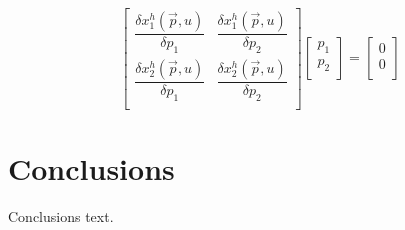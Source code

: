 \documentclass[utf8, twoside,]{article}
\begin{document}
\begin{otherlanguage}{american}
      \begin{equation*}
    \begin{bmatrix}
 \dfrac{\delta x_1^h(\vec{p}, u)}{\delta p_1} 
 & \dfrac{\delta x_1^h(\vec{p}, u)}{\delta p_2} \\[2ex]
 \dfrac{\delta x_2^h(\vec{p}, u)}{\delta p_1} 
 & \dfrac{\delta x_2^h(\vec{p}, u)}{\delta p_2} \\[2ex]
 \end{bmatrix}
 \begin{bmatrix}
 p_1 \\[2ex]
 p_2 \\[2ex]
 \end{bmatrix}
 =
 \begin{bmatrix}
 0 \\[2ex]
 0 \\[2ex]
 \end{bmatrix}
\end{equation*}
 
  

\section{Conclusions}

Conclusions text.

\pagebreak



\printbibliography %
\vfill

\end{otherlanguage}
\end{document}
